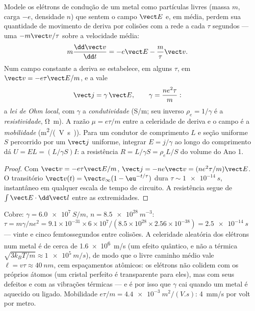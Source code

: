 \begin{proposition}\label{prop:b2:charges-currents-conduction:drude}
Modele os elétrons de condução de um metal como partículas livres (massa $m$,
carga $-e$, densidade $n$) que sentem o campo $\vect E$ e, em média,
perdem sua quantidade de movimento de deriva por colisões com a rede a cada $\tau$
segundos --- uma  $-m\vect v/\tau$ sobre a velocidade média:
\[
m\frac{\dd\vect v}{\dd t} = -e\vect E - \frac m\tau\vect v .
\]
Num campo constante a deriva se estabelece, em alguns $\tau$, em $\vect v = -e\tau
\vect E/m$, e a  vale
\[
\vect j = \gamma\,\vect E , \qquad \gamma = \frac{ne^2\tau}{m} :
\]
a \emph{lei de Ohm local}, com $\gamma$ a \emph{condutividade}
(\unit{S/m}; seu inverso $\rho_e = 1/\gamma$ é a \emph{resistividade},
\unit{\ohm.m}). A razão $\mu = e\tau/m$ entre a celeridade de deriva e o campo é a
\emph{mobilidade} (\unit{m^2/(V.s)}). Para um condutor de comprimento $L$ e
seção uniforme $S$ percorrido por um $\vect j$ uniforme, integrar $E = j/\gamma$
ao longo do comprimento dá $U = EL = (L/\gamma S)I$: a resistência $R = L/\gamma S
= \rho_eL/S$ do volume do Ano 1.
\end{proposition}

\begin{proof}
Com $\vect v = -e\tau\vect E/m$, $\vect j = -ne\vect v = (ne^2\tau/m)\vect E$. O
transitório $\vect v(t) = \vect v_\infty(1 - \eu^{-t/\tau})$ dura $\tau \sim
\qty{1e-14}{s}$, instantâneo em qualquer escala de tempo de circuito. A resistência
segue de $\int\vect E\cdot\dd\vect l$ entre as extremidades.
\end{proof}

\begin{example}\label{ex:b2:charges-currents-conduction:copper}
Cobre: $\gamma = \qty{6.0e7}{S/m}$, $n = \qty{8.5e28}{m^{-3}}$: $\tau = m\gamma/ne^2 =
9.1 \times 10^{-31} \times 6 \times 10^7/(8.5 \times 10^{28} \times 2.56 \times 10^{-38}) = \qty{2.5e-14}{s}$
--- vinte e cinco femtossegundos entre colisões. A celeridade aleatória dos
elétrons num metal é de cerca de \qty{1.6e6}{m/s} (um efeito quântico, e não a
térmica $\sqrt{3k_BT/m} \approx \qty{1e5}{m/s}$), de modo que o livre caminho médio vale $\ell
= v\tau \approx \qty{40}{nm}$, cem espaçamentos atômicos: os elétrons não
colidem com os próprios átomos (um cristal perfeito é transparente para
eles), mas com seus defeitos e com as vibrações térmicas --- e é por isso que
$\gamma$ cai quando um metal é aquecido ou ligado. Mobilidade $e\tau/m =
\qty{4.4e-3}{m^2/(V.s)}$: \qty{4}{mm/s} por volt por metro.
\end{example}

